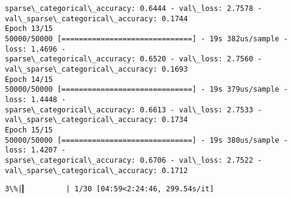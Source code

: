 \documentclass[11pt]{article}
\begin{document}
\begin{Verbatim}[commandchars=\\\{\}]
sparse\_categorical\_accuracy: 0.6444 - val\_loss: 2.7578 -
val\_sparse\_categorical\_accuracy: 0.1744
Epoch 13/15
50000/50000 [==============================] - 19s 382us/sample - loss: 1.4696 -
sparse\_categorical\_accuracy: 0.6520 - val\_loss: 2.7560 -
val\_sparse\_categorical\_accuracy: 0.1693
Epoch 14/15
50000/50000 [==============================] - 19s 379us/sample - loss: 1.4448 -
sparse\_categorical\_accuracy: 0.6613 - val\_loss: 2.7533 -
val\_sparse\_categorical\_accuracy: 0.1734
Epoch 15/15
50000/50000 [==============================] - 19s 380us/sample - loss: 1.4207 -
sparse\_categorical\_accuracy: 0.6706 - val\_loss: 2.7522 -
val\_sparse\_categorical\_accuracy: 0.1712
    \end{Verbatim}

    \begin{Verbatim}[commandchars=\\\{\}]
  3\%|▎         | 1/30 [04:59<2:24:46, 299.54s/it]
    \end{Verbatim}
\end{document}
